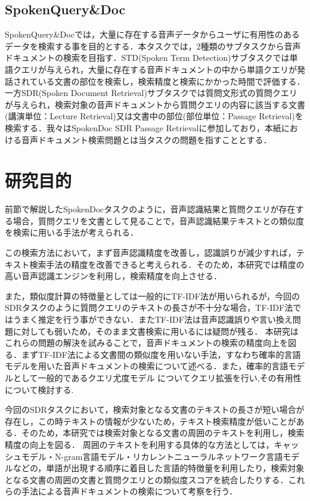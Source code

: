 \subsection{SpokenQuery\&Doc}
SpokenQuery\&Docでは，大量に存在する音声データからユーザに有用性のあるデータを検索する事を目的とする．本タスクでは，2種類のサブタスクから音声ドキュメントの検索を目指す．STD(Spoken Term Detection)サブタスクでは単語クエリが与えられ，大量に存在する音声ドキュメントの中から単語クエリが発話されている文書の部位を検索し，検索精度と検索にかかった時間で評価する．一方SDR(Spoken Document Retrieval)サブタスクでは質問文形式の質問クエリが与えられ，検索対象の音声ドキュメントから質問クエリの内容に該当する文書(講演単位：Lecture Retrieval)又は文書中の部位(部位単位：Passage Retrieval)を検索する．我々はSpokenDoc SDR Passage Retrievalに参加しており，本紙における音声ドキュメント検索問題とは当タスクの問題を指すこととする．

\section{研究目的}
前節で解説したSpokenDocタスクのように，音声認識結果と質問クエリが存在する場合，質問クエリを文書として見ることで，音声認識結果テキストとの類似度を検索に用いる手法が考えられる．

この検索方法において，まず音声認識精度を改善し，認識誤りが減少すれば，テキスト検索手法の精度を改善できると考えられる．そのため，本研究では精度の高い音声認識エンジンを利用し，検索精度を向上させる．

また，類似度計算の特徴量としては一般的にTF-IDF法が用いられるが，今回のSDRタスクのように質問クエリのテキストの長さが不十分な場合，TF-IDF法ではうまく推定を行う事ができない．またTF-IDF法は音声認識誤りや言い換え問題に対しても弱いため，そのまま文書検索に用いるには疑問が残る．
本研究はこれらの問題の解決を試みることで，音声ドキュメントの検索の精度向上を図る．まずTF-IDF法による文書間の類似度を用いない手法，すなわち確率的言語モデルを用いた音声ドキュメントの検索について述べる．また，確率的言語モデルとして一般的であるクエリ尤度モデル \cite{query_likelihood}についてクエリ拡張を行い,その有用性について検討する.

今回のSDRタスクにおいて，検索対象となる文書のテキストの長さが短い場合が存在し，この時テキストの情報が少ないため，テキスト検索精度が低いことがある．そのため，本研究では検索対象となる文書の周囲のテキストを利用し，検索精度の向上を図る．
周囲のテキストを利用する具体的な方法としては，キャッシュモデル・N-gram言語モデル・リカレントニューラルネットワーク言語モデルなどの，単語が出現する順序に着目した言語的特徴量を利用したり，検索対象となる文書の周囲の文書と質問クエリとの類似度スコアを統合したりする．これらの手法による音声ドキュメントの検索について考察を行う．

